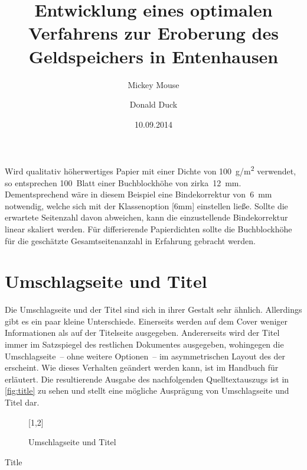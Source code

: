 \documentclass[%
  english,ngerman,%
  geometry=no,DIV=12,automark,%
]{tudscrartcl}
\begin{document}
Wird qualitativ höherwertiges Papier mit einer Dichte von \SI{100}{g/m^2} 
verwendet, so entsprechen 100~Blatt einer Buchblockhöhe von zirka~\SI{12}{mm}. 
Dementsprechend wäre in diesem Beispiel eine Bindekorrektur von~\SI{6}{mm} 
notwendig, welche sich mit der Klassenoption [6mm] einstellen 
ließe. Sollte die erwartete Seitenzahl davon abweichen, kann die einzustellende 
Bindekorrektur linear skaliert werden. Für differierende Papierdichten sollte 
die Buchblockhöhe für die geschätzte Gesamtseitenanzahl in Erfahrung gebracht 
werden.






\section{Umschlagseite und Titel}
Die Umschlagseite und der Titel sind sich in ihrer Gestalt sehr ähnlich. 
Allerdings gibt es ein paar kleine Unterschiede. Einerseits werden auf dem 
Cover weniger Informationen als auf der Titelseite ausgegeben. Andererseits 
wird der Titel immer im Satzspiegel des restlichen Dokumentes ausgegeben, 
wohingegen die Umschlagseite~-- ohne weitere Optionen~-- im asymmetrischen 
Layout des \CDs der \TnUD erscheint. Wie dieses Verhalten geändert werden kann, 
ist im Handbuch für  erläutert. Die resultierende Ausgabe des 
nachfolgenden Quelltextauszugs ist in \autoref{fig:title} zu sehen und stellt 
eine mögliche Ausprägung von Umschlagseite und Titel dar.
%
\begin{figure}
[1,2]
\caption{Umschlagseite und Titel}
\label{fig:title}
\end{figure}

\begin{Trunk!}{Title}
\title{%
  Entwicklung eines optimalen Verfahrens zur Eroberung des
  Geldspeichers in Entenhausen
}
\author{%
  Mickey Mouse
\and%
  Donald Duck
}
\date{10.09.2014}

\makecover
\maketitle

\end{Trunk!}
\end{document}
